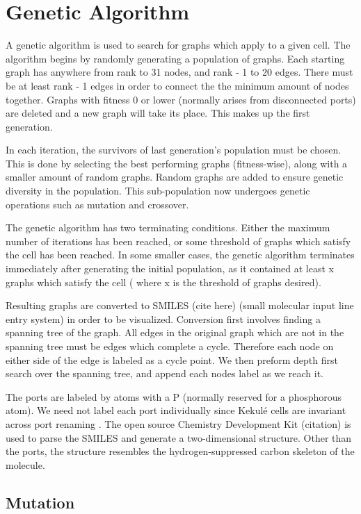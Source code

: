 \documentclass[12pt]{article}
\begin{document}
\section{Genetic Algorithm}

A genetic algorithm is used to search for graphs which apply to a given cell. The algorithm begins by randomly generating a population of graphs. Each starting graph has anywhere from rank to 31 nodes, and rank - 1 to 20 edges. There must be at least rank - 1 edges in order to connect the the minimum amount of nodes together. Graphs with fitness 0 or lower (normally arises from disconnected ports) are deleted and a new graph will take its place. This makes up the first generation.

In each iteration, the survivors of last generation's population must be chosen. This is done by selecting the best performing graphs (fitness-wise), along with a smaller amount of random graphs. Random graphs are added to ensure genetic diversity in the population. This sub-population now undergoes genetic operations such as mutation and crossover. 

The genetic algorithm has two terminating conditions. Either the maximum number of iterations has been reached, or some threshold of graphs which satisfy the cell has been reached. In some smaller cases, the genetic algorithm terminates immediately after generating the initial population, as it contained at least x graphs which satisfy the cell ( where x is the threshold of graphs desired).

Resulting graphs are converted to SMILES (cite here) (small molecular input line entry system) in order to be visualized. Conversion first involves finding a spanning tree of the graph. All edges in the original graph which are not in the spanning tree must be edges which complete a cycle. Therefore each node on either side of the edge is labeled as a cycle point. We then preform depth first search over the spanning tree, and append each nodes label as we reach it.

The ports are labeled by atoms with a P (normally reserved for a phosphorous atom). We need not label each port individually since Kekul\'e cells are invariant across port renaming \cite{H13}. The open source Chemistry Development Kit (citation) is used to parse the SMILES and generate a two-dimensional structure. Other than the ports, the structure resembles the hydrogen-suppressed carbon skeleton of the molecule.  

\subsection{Mutation}
\end{document}
